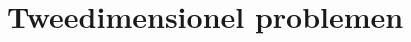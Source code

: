 \documentclass[11pt, a4paper]{book}
\begin{document}
    
    \tableofcontents

                

    \chapter{Tweedimensionel problemen}
\end{document}
